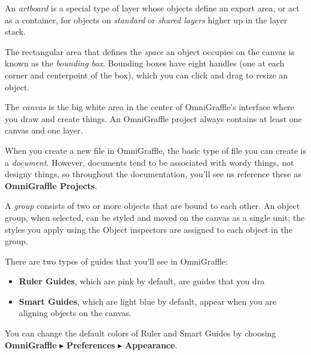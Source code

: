 \documentclass[../main.tex]{subfiles}
\begin{document}
\begin{description}[
      style=nextline,
    ]
  \item[Artboard] An \textit{artboard} is a special type of layer whose objects define an export
    area, or act
    as a container, for objects on \textit{standard} or \textit{shared layers} higher up in the
    layer stack.
  \item[Bounding Box] The rectangular area that defines the \textit{space} an object occupies on
    the canvas
    is known as the \textit{bounding box}. Bounding boxes have eight handles (one at each corner
      and
    centerpoint of the box), which you can click and drag to resize an object.
  \item[Canvas] The \textit{canvas} is the big white area in the center of OmniGraffle's
    interface where you
    draw and create things. An OmniGraffle project always contains at least one canvas and one
    layer.
  \item[Document/Project] When you create a new file in OmniGraffle, the basic type of file you
    can create is
    a \textit{document}. However, documents tend to be associated with wordy things, not designy
    things, so
    throughout the documentation, you'll see us reference these as \textbf{OmniGraffle
    Projects}.
  \item[Group] A \textit{group} consists of two or more objects that are bound to each other. An
    object
    group, when selected, can be styled and moved on the canvas as a single unit; the styles you
    apply using
    the Object inspectors are assigned to each object in the group.
  \item[Guides] There are two types of guides that you'll see in OmniGraffle:
    \begin{itemize}[
          leftmargin=1.5em,
        ]
      \item \textbf{Ruler Guides}, which are pink by default, are guides that you dra
      \item \textbf{Smart Guides}, which are light blue by default, appear when you are aligning
        objects on the canvas.
    \end{itemize}

    You can change the default colors of Ruler and Smart Guides by choosing
    \textbf{OmniGraffle} $\blacktriangleright$
    \textbf{Preferences} $\blacktriangleright$ \textbf{Appearance}.


\end{description}
\end{document}
